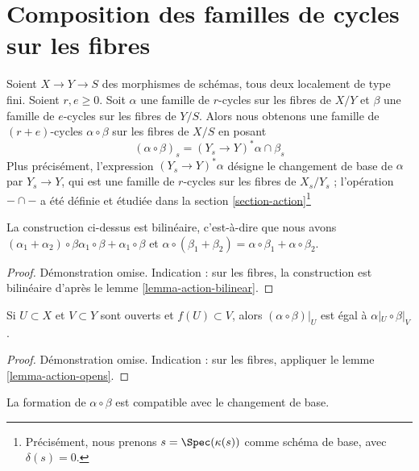 \section{Composition des familles de cycles sur les fibres} 
\label{section-compose-families} 

\noindent
 Soient $X \to Y \to S$ des morphismes de schémas, tous deux localement de type fini. 
Soient $r, e \geq 0$. Soit $\alpha$ une famille de $r$-cycles 
sur les fibres de  $X/Y$  et  $\beta$  une famille de  $e$-cycles sur les
 fibres de  $Y/S$. Alors nous obtenons une famille 
de  $(r + e)$-cycles $\alpha \circ \beta$  sur les fibres de  $X/S$
  en posant 
$$
(\alpha \circ \beta)_s = (Y_s \to Y)^*\alpha \cap \beta_s
$$
 Plus précisément, l'expression $(Y_s \to Y)^*\alpha$ désigne 
le changement de base de $\alpha$  par  $Y_s \to Y$, qui est une famille de  $r$-cycles 
sur les fibres de  $X_s/Y_s$ ; l'opération  $- \cap -$
  a été définie et étudiée dans la section \ref{section-action}\footnote{Précisément, 
nous prenons $s = \Spec(\kappa(s))$ comme schéma de base, avec $\delta(s) = 0$.} 

\begin{lemma} 
\label{lemma-construction-bilinear} La 
construction ci-dessus est bilinéaire, c'est-à-dire que nous avons  
$(\alpha_1 + \alpha_2) \circ \beta \alpha_1 \circ \beta +
\alpha_1 \circ \beta$ et  $\alpha \circ (\beta_1 + \beta_2) =
\alpha \circ \beta_1 + \alpha \circ \beta_2$. 
\end{lemma} 

\begin{proof} 
Démonstration omise. Indication : sur les fibres, la construction est bilinéaire 
d'après le lemme \ref{lemma-action-bilinear}. 
\end{proof} 

\begin{lemma} 
\label{lemma-construction-opens} 
Si  $U \subset X$  et  $V \subset Y$  sont ouverts et  $f(U) \subset V$, alors  
$(\alpha \circ \beta)|_U$ est égal à  $\alpha|_U \circ \beta|_V$. 
\end{lemma} 

\begin{proof} 
Démonstration omise. Indication : sur les fibres, appliquer
 le lemme \ref{lemma-action-opens}. 
\end{proof} 

\begin{lemma} 
\label{lemma-construction-base-change} 
La formation de  $\alpha \circ \beta$  est compatible avec le changement de base. 
\end{lemma} 


